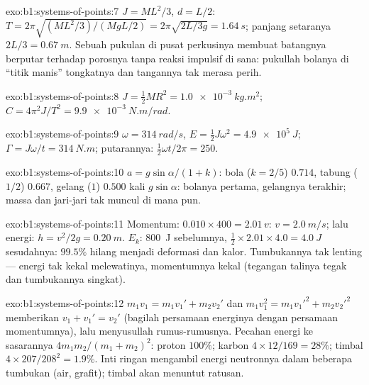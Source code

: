 \begin{solution}{exo:b1:systems-of-points:7}
$J = ML^2/3$, $d = L/2$: $T = 2\pi\sqrt{(ML^2/3)/(MgL/2)} = 2\pi\sqrt{2L/3g}
= \qty{1.64}{s}$; panjang setaranya $2L/3 = \qty{0.67}{m}$. Sebuah pukulan di
pusat perkusinya membuat batangnya berputar terhadap porosnya tanpa
reaksi impulsif di sana: pukullah bolanya di ``titik manis'' tongkatnya dan
tangannya tak merasa perih.
\end{solution}

\begin{solution}{exo:b1:systems-of-points:8}
$J = \tfrac12 MR^2 = \qty{1.0e-3}{kg.m^2}$; $C = 4\pi^2J/T^2 = \qty{9.9e-3}{N.m/rad}$.
\end{solution}

\begin{solution}{exo:b1:systems-of-points:9}
$\omega = \qty{314}{rad/s}$, $E = \tfrac12 J\omega^2 = \qty{4.9e5}{J}$;
$\Gamma = J\omega/t = \qty{314}{N.m}$; putarannya: $\tfrac12\omega t/2\pi = 250$.
\end{solution}

\begin{solution}{exo:b1:systems-of-points:10}
$a = g\sin\alpha/(1 + k)$: bola ($k = 2/5$) $0.714$, tabung ($1/2$)
$0.667$, gelang ($1$) $0.500$ kali $g\sin\alpha$: bolanya pertama, gelangnya terakhir;
massa dan jari-jari tak muncul di mana pun.
\end{solution}

\begin{solution}{exo:b1:systems-of-points:11}
Momentum: $0.010 \times 400 = 2.01\,v$: $v = \qty{2.0}{m/s}$; lalu energi:
$h = v^2/2g = \qty{0.20}{m}$. $E_k$: \qty{800}{J} sebelumnya, $\tfrac12 \times
2.01 \times 4.0 = \qty{4.0}{J}$ sesudahnya: $99.5\%$ hilang menjadi deformasi dan
kalor. Tumbukannya tak lenting --- energi tak kekal melewatinya,
momentumnya kekal (tegangan talinya tegak dan tumbukannya singkat).
\end{solution}

\begin{solution}{exo:b1:systems-of-points:12}
$m_1v_1 = m_1v_1' + m_2v_2'$ dan $m_1v_1^2 = m_1v_1'^2 + m_2v_2'^2$ memberikan
$v_1 + v_1' = v_2'$ (bagilah persamaan energinya dengan persamaan momentumnya),
lalu menyusullah rumus-rumusnya. Pecahan energi ke sasarannya $4m_1m_2/(m_1 + m_2)^2$:
proton $100\%$; karbon $4 \times 12/169 = 28\%$; timbal $4 \times 207/208^2 =
1.9\%$. Inti ringan mengambil energi neutronnya dalam beberapa tumbukan
(air, grafit); timbal akan menuntut ratusan.
\end{solution}

